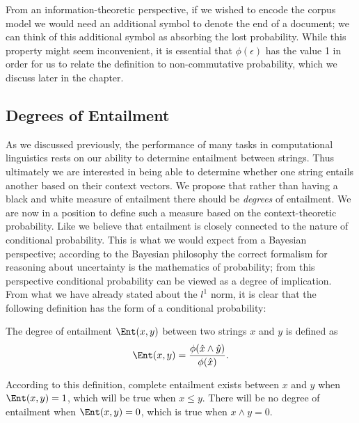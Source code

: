 From an information-theoretic perspective, if we wished to encode the corpus model we would need an additional symbol to denote the end of a document; we can think of this additional symbol as absorbing the lost probability. While this property might seem inconvenient, it is essential that $\phi(\epsilon)$ has the value 1 in order for us to relate the definition to non-commutative probability, which we discuss later in the chapter.


\subsection{Degrees of Entailment}

As we discussed previously, the performance of many tasks in computational linguistics rests on our ability to determine entailment between strings. Thus ultimately we are interested in being able to determine whether one string entails another based on their context vectors.
We propose that rather than having a black and white measure of entailment there should be \emph{degrees} of entailment. We are now in a position to define such a measure based on the context-theoretic probability. Like \cite{Glickman:05} we believe that entailment is closely connected to the nature of conditional probability. This is what we would expect from a Bayesian perspective; according to the Bayesian philosophy the correct formalism for reasoning about uncertainty is the mathematics of probability; from this perspective conditional probability can be viewed as a degree of implication. From what we have already stated about the $l^1$ norm, it is clear that the following definition has the form of a conditional probability:
\begin{defn}
The degree of entailment $\Ent(x,y)$ between two strings $x$ and $y$ is defined as
$$\Ent(x,y) = \frac{\phi(\hat{x}\land\hat{y})}{\phi(\hat{x})}.$$
\end{defn}
According to this definition, complete entailment exists between $x$ and $y$ when $\Ent(x,y) = 1$, which will be true when $x \le y$. There will be no degree of entailment when $\Ent(x,y) = 0$, which is true when $x \land y = 0$.

